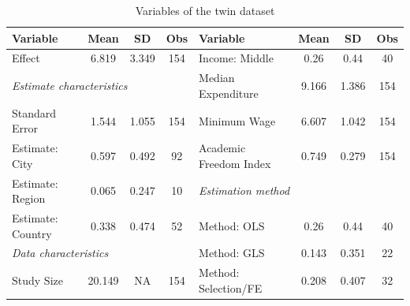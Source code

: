 \begin{table}[!htbp]
  \centering
  \scriptsize
  \singlespace
  \caption{Variables of the twin dataset}
  \label{tab:twins_new_vars}
  \begin{tabular}
    {
      @{\hskip\tabcolsep\extracolsep}
      l
      *{3}{c}
      |
      l
        *{3}{c}
      @{}
    }
    \toprule
    Variable                                                                & Mean   & SD                 & Obs   & Variable                                                               & Mean  & SD    & Obs   \\
    \midrule
    Effect                                                                  & 6.819  & 3.349              & 154   & Income: Middle                                                         & 0.26  & 0.44  & 40  \\
    \multicolumn{3}{l}{\textit{\hspace{0.1cm}Estimate characteristics}}     &        & Median Expenditure & 9.166 & 1.386                                                                  & 154                   \\
    Standard Error                                                          & 1.544  & 1.055              & 154   & Minimum Wage                                                           & 6.607 & 1.042 & 154   \\
    Estimate: City                                                          & 0.597  & 0.492              & 92    & Academic Freedom Index                                                 & 0.749 & 0.279 & 154   \\
    Estimate: Region                                                        & 0.065  & 0.247              & 10    & \multicolumn{3}{l}{\textit{\hspace{0.1cm}Estimation method}}           &                       \\
    Estimate: Country                                                       & 0.338  & 0.474              & 52    & Method: OLS                                                            & 0.26  & 0.44  & 40    \\
    \multicolumn{3}{l}{\textit{\hspace{0.1cm}Data characteristics}}         &        & Method: GLS        & 0.143 & 0.351                                                                  & 22                    \\
    Study Size                                                              & 20.149 & NA                 & 154   & Method: Selection/FE                                                   & 0.208 & 0.407 & 32    \\

\end{tabular}
\end{table}
